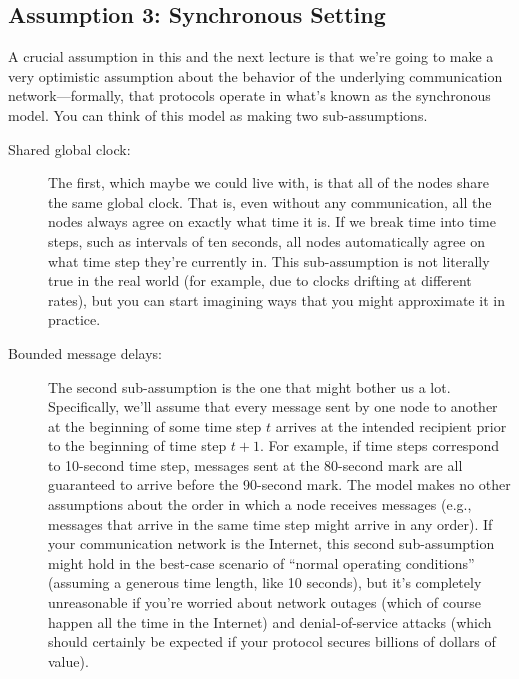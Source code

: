 \subsection{Assumption 3: Synchronous Setting}
A crucial assumption in this and the next lecture is that we’re going to make a very optimistic
assumption about the behavior of the underlying communication network—formally, that protocols operate in what’s known as the synchronous model. You can think of this model
as making two sub-assumptions.
\begin{description}
    \item[Shared global clock:] The first, which maybe we could live with, is that all of the nodes
    share the same global clock. That is, even without any communication, all the nodes always
    agree on exactly what time it is. If we break time into time steps, such as intervals of
    ten seconds, all nodes automatically agree on what time step they’re currently in. This
    sub-assumption is not literally true in the real world (for example, due to clocks drifting at
    different rates), but you can start imagining ways that you might approximate it in practice.
    \item[Bounded message delays:] The second sub-assumption is the one that might bother us
    a lot. Specifically,
    we’ll assume that every message sent by one node to another at the beginning of some time
    step $t$ arrives at the intended recipient prior to the beginning of time step $t+1$. For example,
    if time steps correspond to 10-second time step, messages sent at the 80-second mark are
    all guaranteed to arrive before the 90-second mark. The model makes no other assumptions
    about the order in which a node receives messages (e.g., messages that arrive in the same
    time step might arrive in any order).
    If your communication network is the Internet, this second sub-assumption might hold in
    the best-case scenario of “normal operating conditions” (assuming a generous time length,
    like 10 seconds), but it’s completely unreasonable if you’re worried about network outages
    (which of course happen all the time in the Internet) and denial-of-service attacks (which
    should certainly be expected if your protocol secures billions of dollars of value).


\end{description}
